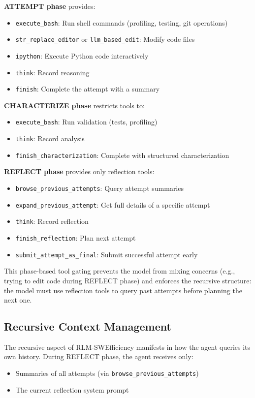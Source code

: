 \documentclass{article}
\theoremstyle{plain}
\theoremstyle{definition}
\theoremstyle{remark}
\begin{document}
\textbf{ATTEMPT phase} provides:
\begin{itemize}
    \item \texttt{execute\_bash}: Run shell commands (profiling, testing, git operations)
    \item \texttt{str\_replace\_editor} or \texttt{llm\_based\_edit}: Modify code files
    \item \texttt{ipython}: Execute Python code interactively
    \item \texttt{think}: Record reasoning
    \item \texttt{finish}: Complete the attempt with a summary
\end{itemize}

\textbf{CHARACTERIZE phase} restricts tools to:
\begin{itemize}
    \item \texttt{execute\_bash}: Run validation (tests, profiling)
    \item \texttt{think}: Record analysis
    \item \texttt{finish\_characterization}: Complete with structured characterization
\end{itemize}

\textbf{REFLECT phase} provides only reflection tools:
\begin{itemize}
    \item \texttt{browse\_previous\_attempts}: Query attempt summaries
    \item \texttt{expand\_previous\_attempt}: Get full details of a specific attempt
    \item \texttt{think}: Record reflection
    \item \texttt{finish\_reflection}: Plan next attempt
    \item \texttt{submit\_attempt\_as\_final}: Submit successful attempt early
\end{itemize}

This phase-based tool gating prevents the model from mixing concerns (e.g., trying to edit code during REFLECT phase) and enforces the recursive structure: the model must use reflection tools to query past attempts before planning the next one.

\subsection{Recursive Context Management}
The recursive aspect of RLM-SWEfficiency manifests in how the agent queries its own history. During REFLECT phase, the agent receives only:
\begin{itemize}
    \item Summaries of all attempts (via \texttt{browse\_previous\_attempts})
    \item The current reflection system prompt
\end{itemize}
\end{document}
